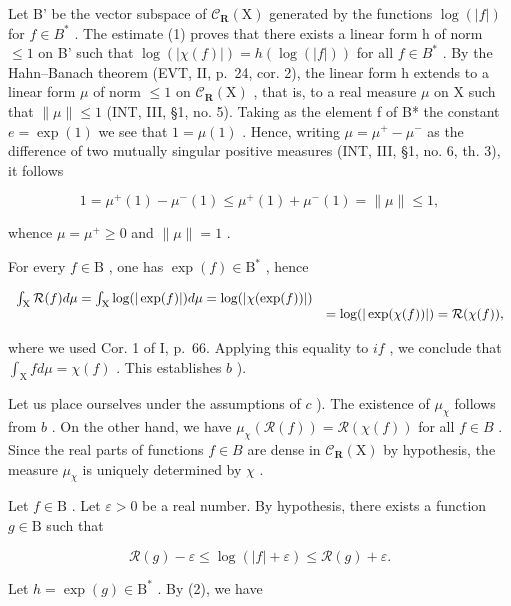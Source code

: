 Let B' be the vector subspace of \(\mathcal{C}_{\mathbf{R}}(\mathrm{X})\) generated by the functions \(\log(|f|)\) for \(f \in B^{*}\) . The estimate (1) proves that there exists a linear form h of norm \(\leqslant 1\) on B' such that \(\log(|\chi(f)|) = h(\log(|f|))\) for all \(f \in B^{*}\) . By the Hahn--Banach theorem (EVT, II, p.~24, cor. 2), the linear form h extends to a linear form \(\mu\) of norm \(\leqslant 1\) on \(\mathcal{C}_{\mathbf{R}}(\mathrm{X})\) , that is, to a real measure \(\mu\) on X such that \(\|\mu\| \leqslant 1\) (INT, III, §1, no. 5). Taking as the element f of B* the constant \(e = \exp(1)\) we see that \(1 = \mu(1)\) . Hence, writing \(\mu = \mu^{+} - \mu^{-}\) as the difference of two mutually singular positive measures (INT, III, §1, no. 6, th. 3), it follows

\[
1 = \mu^ {+} (1) - \mu^ {-} (1) \leqslant \mu^ {+} (1) + \mu^ {-} (1) = \| \mu \| \leqslant 1,
\]

whence \(\mu = \mu^{+} \geqslant 0\) and \(\|\mu\| = 1\) .

For every \(f \in \mathrm{B}\) , one has \(\exp(f) \in \mathrm{B}^*\) , hence

\[
\begin{array}{r l} \int_ {\mathrm{X}} \mathcal {R} (f) d \mu = \int_ {\mathrm{X}} \log (| \exp (f) |) d \mu = \log (| \chi (\exp (f)) |) \\ & = \log (| \exp (\chi (f)) |) = \mathcal {R} (\chi (f)), \end{array}
\]

where we used Cor. 1 of I, p.~66. Applying this equality to \(if\) , we conclude that \(\int_{\mathrm{X}} f d\mu = \chi(f)\) . This establishes \(b\) ).

Let us place ourselves under the assumptions of \(c\) ). The existence of \(\mu_{\chi}\) follows from \(b\) . On the other hand, we have \(\mu_{\chi}(\mathcal{R}(f)) = \mathcal{R}(\chi(f))\) for all \(f \in B\) . Since the real parts of functions \(f \in B\) are dense in \(\mathcal{C}_{\mathbf{R}}(\mathrm{X})\) by hypothesis, the measure \(\mu_{\chi}\) is uniquely determined by \(\chi\) .

Let \(f \in \mathrm{B}\) . Let \(\varepsilon > 0\) be a real number. By hypothesis, there exists a function \(g \in \mathrm{B}\) such that

\[
\mathcal {R} (g) - \varepsilon \leqslant \log (| f | + \varepsilon) \leqslant \mathcal {R} (g) + \varepsilon .\tag{2}
\]

Let \(h = \exp(g) \in \mathrm{B}^*\) . By (2), we have

